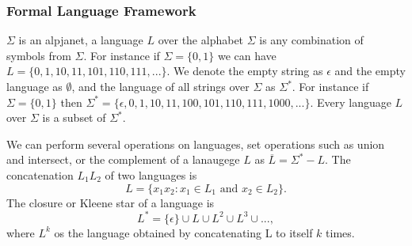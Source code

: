 \subsubsection{Formal Language Framework}
$\Sigma$ is an alpjanet, a language $L$ over the alphabet $\Sigma$ is any combination of symbols from $\Sigma$.
For instance if $\Sigma = \{0,1\}$ we can have $L = \{0,1,10,11,101,110,111 , ...\}$. We denote the empty string as $\epsilon$ and the empty language as $\emptyset$, and the language of all strings over $\Sigma$ as $\Sigma^*$.
For instance if $\Sigma = \{0,1\}$ then $\Sigma^* = \{\epsilon,0,1,10,11,100,101,110,111,1000,...\}$. Every language $L$over $\Sigma$ is a subset of $\Sigma^*$.

We can perform several operations on languages, set operations such as union and intersect, or the complement of a lanaugege $L$ as $\overline{L} = \Sigma^* - L$. The concatenation $L_1L_2$ of two languages is
\[
  L = \{x_1x_2 : x_1 \in L_1 \text{ and } x_2 \in L_2\}.
\]
The closure or Kleene star of a language is
\[
  L^* = \{\epsilon\}\cup L\cup L^2 \cup L^3 \cup ... ,
\]
where $L^k$ os the language obtained by concatenating L to itself $k$ times.





